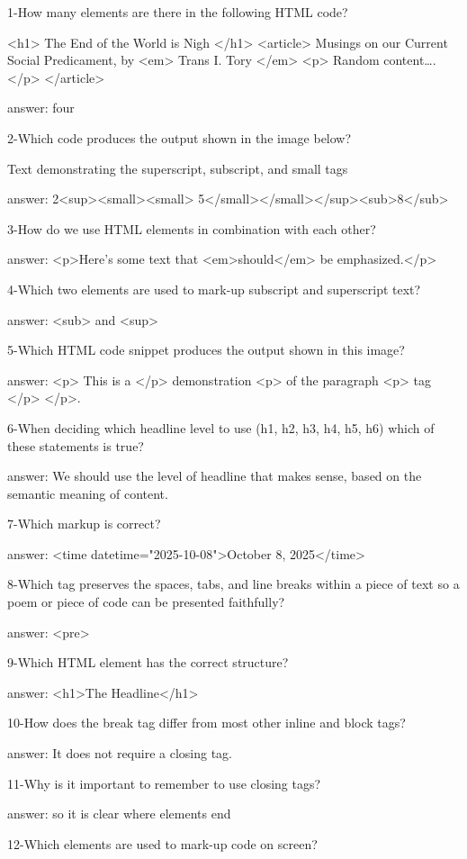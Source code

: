 1-How many elements are there in the following HTML code?

<h1> The End of the World is Nigh </h1>
<article> Musings on our Current Social Predicament, by <em> Trans  I. Tory </em>
<p> Random content….</p>
</article>

answer: four

2-Which code produces the output shown in the image below? 

Text demonstrating the superscript, subscript, and small tags

answer: 2<sup><small><small> 5</small></small></sup><sub>8</sub>

3-How do we use HTML elements in combination with each other?

answer: <p>Here's some text that <em>should</em> be emphasized.</p>

4-Which two elements are used to mark-up subscript and superscript text?

answer: <sub> and <sup>

5-Which HTML code snippet produces the output shown in this image? 

answer: <p> This is a </p> demonstration <p> of the paragraph <p> tag </p> </p>.

6-When deciding which headline level to use (h1, h2, h3, h4, h5, h6) which of these statements is true?

answer: We should use the level of headline that makes sense, based on the semantic meaning of content.

7-Which markup is correct?

answer: <time datetime="2025-10-08">October 8, 2025</time>

8-Which tag preserves the spaces, tabs, and line breaks within a piece of text so a poem or piece of code can be presented faithfully?

answer: <pre>

9-Which HTML element has the correct structure?

answer: <h1>The Headline</h1>

10-How does the break tag differ from most other inline and block tags?

answer: It does not require a closing tag.

11-Why is it important to remember to use closing tags?

answer: so it is clear where elements end

12-Which elements are used to mark-up code on screen?

